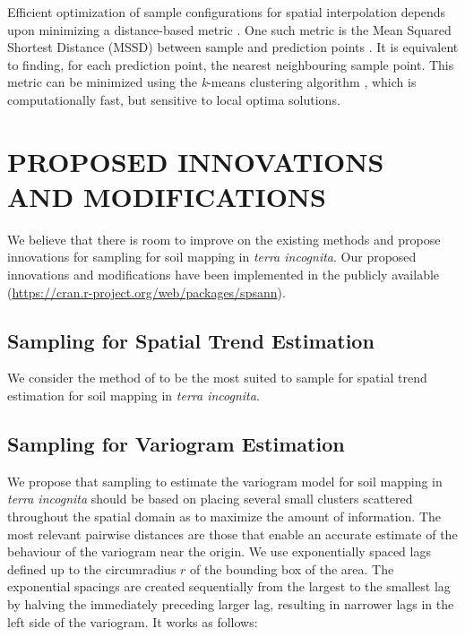 Efficient optimization of sample configurations for spatial interpolation depends upon minimizing a 
distance-based metric \cite{RoyleEtAl1998}. One such metric is the Mean Squared Shortest Distance (MSSD) 
between sample and prediction points \cite{BrusEtAl2006}. It is equivalent to finding, for each prediction 
point, the nearest neighbouring sample point. This metric can be minimized using the \textit{k}-means 
clustering algorithm \cite{WalvoortEtAl2010}, which is computationally fast, but sensitive to local optima 
solutions.

\section{PROPOSED INNOVATIONS AND MODIFICATIONS}

We believe that there is room to improve on the existing methods and propose innovations for sampling for soil 
mapping in \emph{terra incognita}. Our proposed innovations and modifications have been implemented in the 
publicly available  (\url{https://cran.r-project.org/web/packages/spsann}).

\subsection{Sampling for Spatial Trend Estimation}

We consider the method of \cite{MinasnyEtAl2006b} to be the most suited to sample for spatial trend estimation 
for soil mapping in \emph{terra incognita}.

\subsection{Sampling for Variogram Estimation}

We propose that sampling to estimate the variogram model for soil mapping in \emph{terra incognita} should be 
based on placing several small clusters scattered throughout the spatial domain as to maximize the amount of 
information. The most relevant pairwise distances are those that enable an accurate estimate of the behaviour 
of the variogram near the origin. We use exponentially spaced lags defined up to the circumradius $r$ of the 
bounding box of the area. The exponential spacings are created sequentially from the largest to the smallest 
lag by halving the immediately preceding larger lag, resulting in narrower lags in the left side of the 
variogram. It works as follows:

